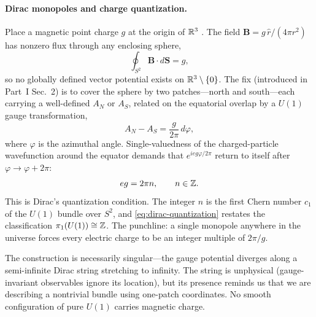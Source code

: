 \paragraph{Dirac monopoles and charge quantization.}
Place a magnetic point charge $g$ at the origin of $\mathbb{R}^3$ \cite{Dirac1931QuantisedSingularities}. The field $\mathbf{B} = g\,\hat{r}/(4\pi r^2)$ has nonzero flux through any enclosing sphere,
\begin{equation}
  \oint_{S^2} \mathbf{B}\cdot d\mathbf{S} = g,
  \label{eq:monopole-flux}
\end{equation}
so no globally defined vector potential exists on $\mathbb{R}^3\setminus\{0\}$. The fix (introduced in Part~I Sec.~2) is to cover the sphere by two patches---north and south---each carrying a well-defined $A_N$ or $A_S$, related on the equatorial overlap by a $U(1)$ gauge transformation,
\begin{equation}
  A_N - A_S = \frac{g}{2\pi}\,d\varphi,
  \label{eq:dirac-patching}
\end{equation}
where $\varphi$ is the azimuthal angle. Single-valuedness of the charged-particle wavefunction around the equator demands that $e^{ieg\varphi/2\pi}$ return to itself after $\varphi\to\varphi+2\pi$:
\begin{equation}
  eg = 2\pi n, \qquad n\in\mathbb{Z}.
  \label{eq:dirac-quantization}
\end{equation}
This is Dirac's quantization condition. The integer $n$ is the first Chern number $c_1$ of the $U(1)$ bundle over $S^2$, and \eqref{eq:dirac-quantization} restates the classification $\pi_1(U(1))\cong\mathbb{Z}$. The punchline: a single monopole anywhere in the universe forces every electric charge to be an integer multiple of $2\pi/g$.

The construction is necessarily singular---the gauge potential diverges along a semi-infinite Dirac string stretching to infinity. The string is unphysical (gauge-invariant observables ignore its location), but its presence reminds us that we are describing a nontrivial bundle using one-patch coordinates. No smooth configuration of pure $U(1)$ carries magnetic charge.

